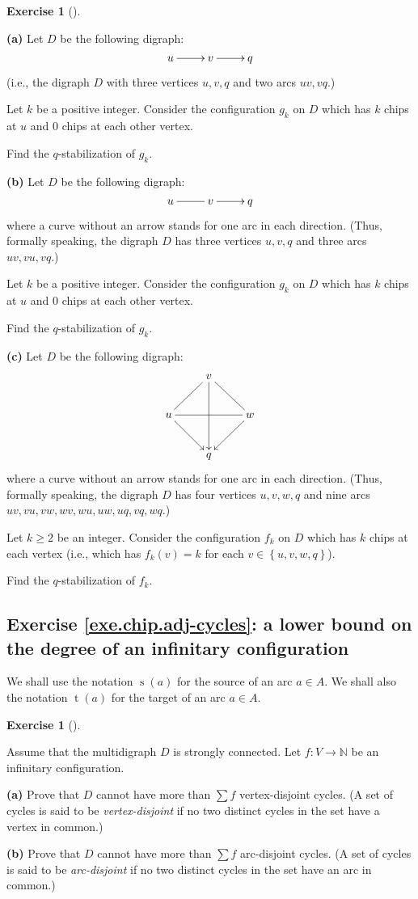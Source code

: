 \documentclass[numbers=enddot,12pt,final,onecolumn,notitlepage]{scrartcl}%
\makeatletter
\newcounter{exer}
\theoremstyle{definition}
\newtheorem{exmp}[exer]{Exercise}
\newenvironment{exercise}[1][]
{\begin{exmp}[#1]\begin{leftbar}}
{\end{leftbar}\end{exmp}}
\let\sumnonlimits\sum
\renewcommand{\sum}{\sumnonlimits\limits}
\newcommand{\NN}{\mathbb{N}}
\newcommand{\set}[1]{\left\{ #1 \right\}}
\newcommand{\tup}[1]{\left( #1 \right)}
\newcommand{\are}{\ar@{-}}
\makeatother
\begin{document}
\Needspace{15cm}
\begin{exercise} \label{exe.chip.examples}
\textbf{(a)} Let $D$ be the following digraph:
\[
\xymatrix{
 u \ar[r] & v \ar[r] & q
}
\]
(i.e., the digraph $D$ with three vertices
$u, v, q$ and two arcs $uv, vq$.)

Let $k$ be a positive integer.
Consider the configuration $g_k$ on $D$ which has $k$ chips at $u$
and $0$ chips at each other vertex.

Find the $q$-stabilization of $g_k$.

\textbf{(b)} Let $D$ be the following digraph:
\[
\xymatrix{
 u \are[r] & v \ar[r] & q
}
\]
where a curve without an arrow stands for one arc in each
direction.
(Thus, formally speaking, the digraph $D$ has three vertices
$u, v, q$ and three arcs $uv, vu, vq$.)

Let $k$ be a positive integer.
Consider the configuration $g_k$ on $D$ which has $k$ chips at $u$
and $0$ chips at each other vertex.

Find the $q$-stabilization of $g_k$.

\textbf{(c)} Let $D$ be the following digraph:
\[
\xymatrix{
 & v \are[dl] \are[dr] \ar[dd] \\
 u \are[rr] \ar[dr] & & w \ar[dl] \\
 & q
}
\]
where a curve without an arrow stands for one arc in each
direction.
(Thus, formally speaking, the digraph $D$ has four vertices
$u, v, w, q$ and nine arcs
$uv, vu, vw, wv, wu, uw, uq, vq, wq$.)

Let $k \geq 2$ be an integer.
Consider the configuration $f_k$ on $D$ which has $k$ chips at each
vertex (i.e., which has $f_k \tup{v} = k$ for each
$v \in \set{u, v, w, q}$).

Find the $q$-stabilization of $f_k$.
\end{exercise}

\subsection{Exercise \ref{exe.chip.adj-cycles}: a lower bound
on the degree of an infinitary configuration}

We shall use the notation
$\operatorname{s}\tup{a}$ for the source of an arc
$a \in A$.
We shall also the notation
$\operatorname{t}\tup{a}$ for the target of an arc
$a \in A$.

\begin{exercise} \label{exe.chip.adj-cycles}
Assume that the multidigraph $D$ is strongly connected.
Let $f : V \to \NN$ be an infinitary configuration.

\textbf{(a)} Prove that $D$ cannot have more than
$\sum f$ vertex-disjoint cycles.
(A set of cycles is said to be \textit{vertex-disjoint}
if no two distinct cycles in the set have a vertex in
common.)

\textbf{(b)} Prove that $D$ cannot have more than
$\sum f$ arc-disjoint cycles.
(A set of cycles is said to be \textit{arc-disjoint}
if no two distinct cycles in the set have an arc in
common.)
\end{exercise}
\end{document}

